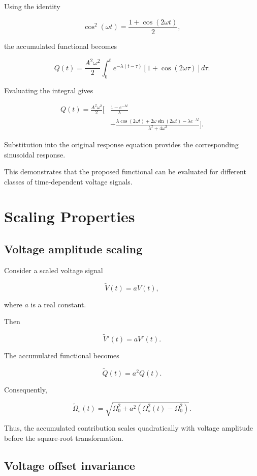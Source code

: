 \documentclass[12pt]{article}
\theoremstyle{definition}
\theoremstyle{remark}
\begin{document}
Using the identity

\[
\cos^2(\omega t)
=
\frac{1+\cos(2\omega t)}{2},
\]

the accumulated functional becomes

\[
Q(t)=
\frac{A^2\omega^2}{2}
\int_0^t
e^{-\lambda(t-\tau)}
\left[1+\cos(2\omega\tau)\right]d\tau.
\]

Evaluating the integral gives

\begin{align}
Q(t)=\frac{A^2\omega^2}{2}
\Bigg[
&\frac{1-e^{-\lambda t}}{\lambda}
\\
&+
\frac{
\lambda\cos(2\omega t)
+2\omega\sin(2\omega t)
-\lambda e^{-\lambda t}
}{
\lambda^2+4\omega^2
}
\Bigg].
\label{eq:sinusoidal-response}
\end{align}

Substitution into the original response
equation provides the corresponding
sinusoidal response.

This demonstrates that the proposed functional
can be evaluated for different classes of
time-dependent voltage signals.

\section{Scaling Properties}

\subsection{Voltage amplitude scaling}

Consider a scaled voltage signal

\[
\widetilde{V}(t)=aV(t),
\]

where \(a\) is a real constant.

Then

\[
\widetilde{V}'(t)=aV'(t).
\]

The accumulated functional becomes

\[
\widetilde{Q}(t)=a^2Q(t).
\]

Consequently,

\begin{equation}
\widetilde{\Omega}_s(t)=
\sqrt{
\Omega_0^2+
a^2\left(\Omega_s^2(t)-\Omega_0^2\right)
}.
\label{eq:scaling}
\end{equation}

Thus, the accumulated contribution scales
quadratically with voltage amplitude before
the square-root transformation.

\subsection{Voltage offset invariance}
\end{document}
